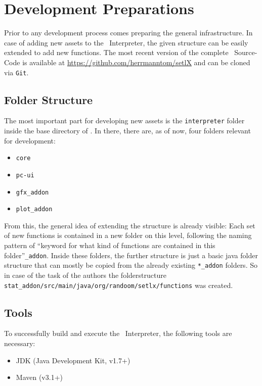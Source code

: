 

\chapter{Development Preparations}

Prior to any development process comes preparing the general infrastructure. In case of adding new assets to the \setlx\ Interpreter, the given structure can be easily extended to add new functions. The most recent version of the complete \setlx\ Source-Code is available at \href{https://github.com/herrmanntom/setlX}{https://github.com/herrmanntom/setlX} and can be cloned via \lstinline{Git}.

\section{Folder Structure}

The most important part for developing new assets is the \lstinline{interpreter} folder inside the base directory of \setlx. In there, there are, as of now, four folders relevant for development:

\begin{itemize}
	\item \lstinline{core}
	\item \lstinline{pc-ui}
	\item \lstinline{gfx_addon}
	\item \lstinline{plot_addon}
\end{itemize}

From this, the general idea of extending the structure is already visible: Each set of new functions is contained in a new folder on this level, following the naming pattern of \enquote{keyword for what kind of functions are contained in this folder}\lstinline{_addon}. Inside these folders, the further structure is just a basic java folder structure that can mostly be copied from the already existing \lstinline{*_addon} folders. So in case of the task of the authors the folderstructure \lstinline{stat_addon/src/main/java/org/randoom/setlx/functions} was created.

\section{Tools}

To successfully build and execute the \setlx\ Interpreter, the following tools are necessary:

\begin{itemize}
 \item JDK (Java Development Kit, v1.7+)
 \item Maven (v3.1+)
\end{itemize}

